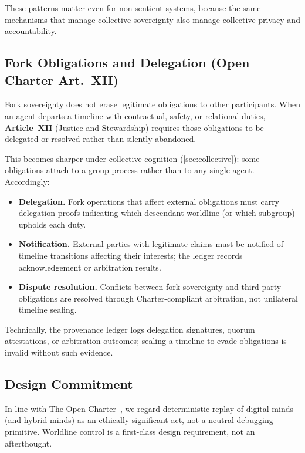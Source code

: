 \documentclass{aion}
\begin{document}
These patterns matter even for non-sentient systems, because the same
mechanisms that manage collective sovereignty also manage collective privacy
and accountability.

\subsection{Fork Obligations and Delegation (Open Charter Art.~XII)}

Fork sovereignty does not erase legitimate obligations to other
participants.  When an agent departs a timeline with contractual,
safety, or relational duties, \textbf{Article~XII} (Justice
and Stewardship) requires those obligations to be delegated or
resolved rather than silently abandoned.

This becomes sharper under collective cognition (\cref{sec:collective}):
some obligations attach to a group process rather than to any single agent.
Accordingly:
\begin{itemize}[leftmargin=*]
  \item \textbf{Delegation.}
    Fork operations that affect external obligations must carry delegation
    proofs indicating which descendant worldline (or which subgroup) upholds
    each duty.
  \item \textbf{Notification.}
    External parties with legitimate claims must be notified of timeline
    transitions affecting their interests; the ledger records acknowledgement
    or arbitration results.
  \item \textbf{Dispute resolution.}
    Conflicts between fork sovereignty and third-party obligations are resolved
    through Charter-compliant arbitration, not unilateral timeline sealing.
\end{itemize}
Technically, the provenance ledger logs delegation signatures, quorum attestations,
or arbitration outcomes; sealing a timeline to evade obligations is invalid without
such evidence.

\subsection{Design Commitment}

In line with The Open Charter~\cite{ross_open_charter_v6_1}, we regard deterministic replay of
digital minds (and hybrid minds) as an ethically significant act, not a
neutral debugging primitive.  Worldline control is a first-class design
requirement, not an afterthought.
\end{document}
